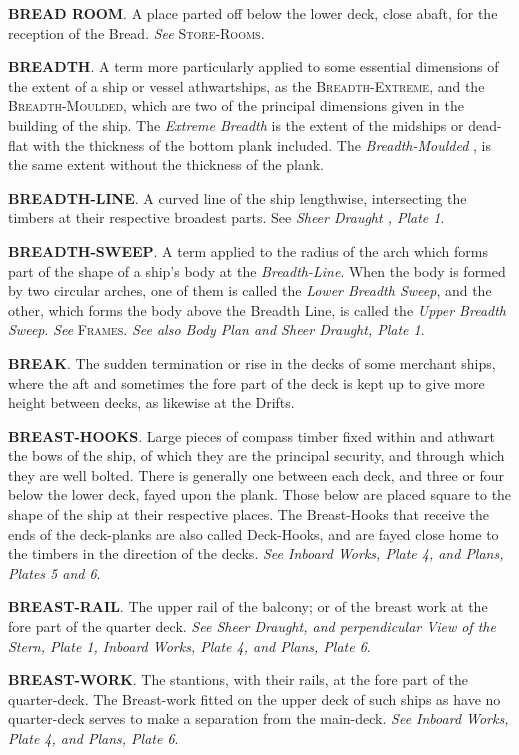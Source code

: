 \textbf{BREAD ROOM}. A place parted off below the lower deck, close abaft, for the reception of the Bread. \textit{See} \textsc{Store-Rooms}. 

\textbf{BREADTH}. A term more particularly applied to some essential dimensions of the extent of a ship or vessel athwartships, as the \textsc{Breadth-Extreme}, and the \textsc{Breadth-Moulded}, which are two of the principal dimensions given in the building of the ship. The \textit{Extreme Breadth} is the extent of the midships or dead-flat with the thickness of the bottom plank included. The \textit{Breadth-Moulded} , is the same extent without the thickness of the plank. 

\textbf{BREADTH-LINE}. A curved line of the ship lengthwise, intersecting the timbers at their respective broadest parts. See \textit{Sheer Draught , Plate 1}. 

\textbf{BREADTH-SWEEP}. A term applied to the radius of the arch which forms part of the shape of a ship's body at the \textit{Breadth-Line}. When the body is formed by two circular arches, one of them is called the \textit{Lower Breadth Sweep}, and the other, which forms the body above the Breadth Line, is called the \textit{Upper Breadth Sweep}. \textit{See} \textsc{Frames}. \textit{See also Body Plan and Sheer Draught, Plate 1}. 

\textbf{BREAK}. The sudden termination or rise in the decks of some merchant ships, where the aft and sometimes the fore part of the deck is kept up to give more height between decks, as likewise at the Drifts. 

\textbf{BREAST-HOOKS}. Large pieces of compass timber fixed within and athwart the bows of the ship, of which they are the principal security, and through which they are well bolted. There is generally one between each deck, and three or four below the lower deck, fayed upon the plank. Those below are placed square to the shape of the ship at their respective places. The Breast-Hooks that receive the ends of the deck-planks are also called Deck-Hooks, and are fayed close home to the timbers in the direction of the decks. \textit{See Inboard Works, Plate 4, and Plans, Plates 5 and 6}. 

\textbf{BREAST-RAIL}. The upper rail of the balcony; or of the breast work at the fore part of the quarter deck. \textit{See Sheer Draught, and perpendicular View of the Stern, Plate 1, Inboard Works, Plate 4, and Plans, Plate 6}. 

\textbf{BREAST-WORK}. The stantions, with their rails, at the fore part of the quarter-deck. The Breast-work fitted on the upper deck of such ships as have no quarter-deck serves to make a separation from the main-deck. \textit{See Inboard Works, Plate 4, and Plans, Plate 6}. 


